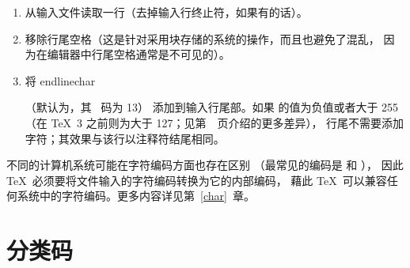 \documentclass{book}
\begin{document}
\begin{enumerate}
\item 从输入文件读取一行（去掉输入行终止符，如果有的话）。
\item 移除行尾空格（这是针对采用块存储的系统的操作，而且也避免了混乱，
因为在编辑器中行尾空格通常是不可见的）。
\item 将 \csterm endlinechar\par （默认为，其 \ascii\ 码为 13）%
添加到输入行尾部。如果  的值为负值或者大于 255%
（在 \TeX\ 3 之前则为大于 127；见第~\pageref{2vs3}~页介绍的更多差异），
\label{append:elc}%
行尾不需要添加字符；其效果与该行以注释符结尾相同。
\end{enumerate}


不同的计算机系统可能在字符编码方面也存在区别%
（最常见的编码是 \ascii{} 和 \ebcdic{}），
因此 \TeX\ 必须要将文件输入的字符编码转换为它的内部编码，
藉此 \TeX\ 可以兼容任何系统中的字符编码。更多内容详见第~\ref{char}~章。

\section{分类码}
\end{document}
